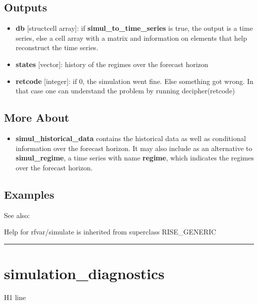 \documentclass[letterpaper,10pt,english]{sphinxmanual}
\begin{document}
\subsection{Outputs}
\label{classes/models/@rfvar/rfvar:id144}\begin{itemize}
\item {} 
\textbf{db} {[}struct\textbar{}cell array{]}: if \textbf{simul\_to\_time\_series} is true, the
output is a time series, else a cell array with a matrix and
information on elements that help reconstruct the time series.

\item {} 
\textbf{states} {[}vector{]}: history of the regimes over the forecast horizon

\item {} 
\textbf{retcode} {[}integer{]}: if 0, the simulation went fine. Else something
got wrong. In that case one can understand the problem by running
decipher(retcode)

\end{itemize}


\subsection{More About}
\label{classes/models/@rfvar/rfvar:id145}\begin{itemize}
\item {} 
\textbf{simul\_historical\_data} contains the historical data as well as
conditional information over the forecast horizon. It may also include
as an alternative to \textbf{simul\_regime}, a time series with name
\textbf{regime}, which indicates the regimes over the forecast horizon.

\end{itemize}


\subsection{Examples}
\label{classes/models/@rfvar/rfvar:id146}
See also:

Help for rfvar/simulate is inherited from superclass RISE\_GENERIC


\bigskip\hrule{}\bigskip



\section{simulation\_diagnostics}
\label{classes/models/@rfvar/rfvar:id147}\label{classes/models/@rfvar/rfvar:simulation-diagnostics}
H1 line
\end{document}
